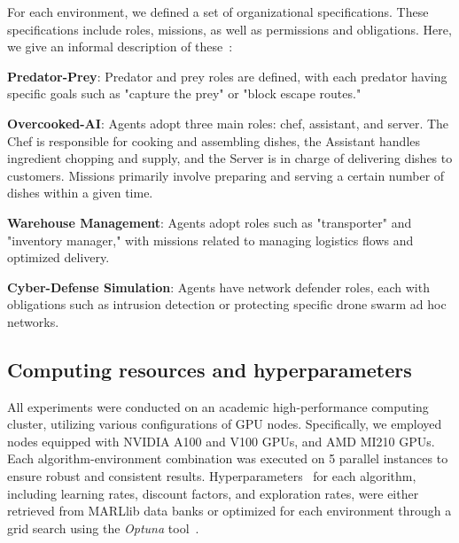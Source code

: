\documentclass[sigconf]{aamas}
\begin{document}
For each environment, we defined a set of organizational specifications. These specifications include roles, missions, as well as permissions and obligations. Here, we give an informal description of these~\hyperref[fn:github]{\footnotemark[1]}:
%
\begin{enumerate*}[label={\roman*) },itemjoin={; \quad}]

  \item \textbf{Predator-Prey}: Predator and prey roles are defined, with each predator having specific goals such as "capture the prey" or "block escape routes."

  \item \textbf{Overcooked-AI}: Agents adopt three main roles: chef, assistant, and server. The Chef is responsible for cooking and assembling dishes, the Assistant handles ingredient chopping and supply, and the Server is in charge of delivering dishes to customers. Missions primarily involve preparing and serving a certain number of dishes within a given time.

  \item \textbf{Warehouse Management}: Agents adopt roles such as "transporter" and "inventory manager," with missions related to managing logistics flows and optimized delivery.

  \item \textbf{Cyber-Defense Simulation}: Agents have network defender roles, each with obligations such as intrusion detection or protecting specific drone swarm ad hoc networks.
\end{enumerate*}

\subsection{Computing resources and hyperparameters}

All experiments were conducted on an academic high-performance computing cluster, utilizing various configurations of GPU nodes. Specifically, we employed nodes equipped with NVIDIA A100 and V100 GPUs, and AMD MI210 GPUs. Each algorithm-environment combination was executed on 5 parallel instances to ensure robust and consistent results.
%
Hyperparameters~\hyperref[fn:github]{\footnotemark[1]} for each algorithm, including learning rates, discount factors, and exploration rates, were either retrieved from MARLlib data banks or optimized for each environment through a grid search using the \textit{Optuna} tool~\cite{akiba2019optuna}.
\end{document}
